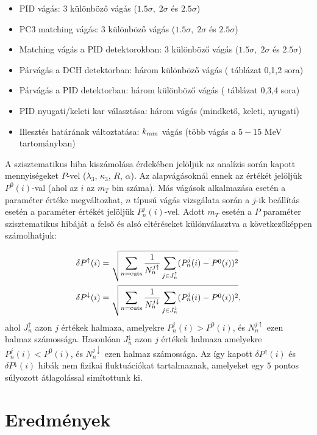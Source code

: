 \documentclass[11pt,a4paper]{article}
\numberwithin{equation}{subsection}
\numberwithin{figure}{section}
\begin{document}
\begin{itemize}
\item PID vágás: 3 különböző vágás ($1.5\sigma,\;2\sigma$ és $2.5\sigma$)
\item PC3 matching vágás: 3 különböző vágás ($1.5\sigma,\;2\sigma$ és $2.5\sigma$)
\item Matching vágás a PID detektorokban: 3 különböző vágás ($1.5\sigma,\;2\sigma$ és $2.5\sigma$)
\item Párvágás a DCH detektorban: három különböző vágás ( táblázat 0,1,2 sora)
\item Párvágás a PID detektorban: három különböző vágás ( táblázat 0,3,4 sora)
\item PID nyugati/keleti kar választása: három vágás (mindkető, keleti, nyugati)
\item Illesztés határának változtatása: $k_{\rm min}$ vágás (több vágás a $5-15$ MeV tartományban)
\end{itemize}

A szisztematikus hiba kiszámolása érdekében jelöljük az analízis során kapott mennyiségeket $P$-vel ($\lambda_3$, $\kappa_3$, $R$, $\alpha$). Az alapvágásoknál ennek az értékét jelöljük $P^0(i)$-val (ahol az $i$ az $m_T$ bin száma). Más vágások alkalmazása esetén a paraméter értéke megváltozhat, $n$ típusú vágás vizsgálata során a $j$-ik beállítás esetén a paraméter értékét jelöljük $P_n^j(i)$-vel. Adott $m_T$ esetén a $P$ paraméter szisztematikus hibáját a felső és alsó eltéréseket különválasztva a következőképpen számolhatjuk:

\begin{align}
\delta P^\uparrow(i)  &=\sqrt{\sum_{n={\rm cuts}}\frac{1}{N_n^{j\uparrow  }}\sum_{j\in J_n^\uparrow  }(P_n^j(i)-P^0(i))^2}\\
\delta P^\downarrow(i)&=\sqrt{\sum_{n={\rm cuts}}\frac{1}{N_n^{j\downarrow}}\sum_{j\in J_n^\downarrow}(P_n^j(i)-P^0(i))^2},
\end{align}
ahol $J_n^\uparrow$ azon $j$ értékek halmaza, amelyekre $P_n^j(i)>P^0(i)$, és $N_n^{j\uparrow}$ ezen halmaz számossága. Hasonlóan $J_n^\downarrow$ azon $j$ értékek halmaza amelyekre $P_n^j(i)<P^0(i)$, és  $N_n^{j\downarrow}$ ezen halmaz számossága. Az így kapott $\delta
P^\uparrow(i)$ és $\delta P^\downarrow(i)$ hibák nem fizikai fluktuációkat tartalmaznak, amelyeket egy $5$ pontos súlyozott átlagolással simítottunk ki.




\section{Eredmények}
\end{document}

